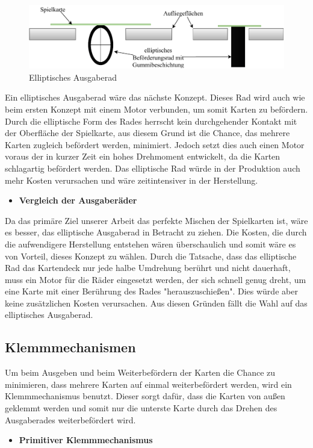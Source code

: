 \begin{figure}[H]
    \centering
    \includegraphics[scale=0.9,page=1]{fig/mech/ElliptischesAusgaberad}
    \caption{Elliptisches Ausgaberad}
\end{figure}


Ein elliptisches Ausgaberad wäre das nächste Konzept.
Dieses Rad wird auch wie beim ersten Konzept mit einem Motor verbunden, um somit Karten zu befördern.
Durch die elliptische Form des Rades herrscht kein durchgehender Kontakt mit der Oberfläche der Spielkarte, aus diesem Grund ist die Chance, das mehrere
Karten zugleich befördert werden, minimiert.
Jedoch setzt dies auch einen Motor voraus der in kurzer Zeit ein hohes Drehmoment entwickelt, da die
Karten schlagartig befördert werden.
Das elliptische Rad würde in der Produktion auch mehr Kosten verursachen und wäre zeitintensiver in der Herstellung. \\

\begin{itemize}
    \item \textbf{Vergleich der Ausgaberäder}
\end{itemize}

Da das primäre Ziel unserer Arbeit das perfekte Mischen der Spielkarten ist, wäre es besser, das elliptische Ausgaberad in Betracht zu ziehen.
Die Kosten, die durch die aufwendigere Herstellung entstehen wären überschaulich und somit wäre es von Vorteil, dieses Konzept zu wählen.
Durch die Tatsache, dass das elliptische Rad das Kartendeck nur jede halbe Umdrehung berührt und nicht dauerhaft, muss ein Motor für die Räder eingesetzt werden, der sich schnell genug dreht, um eine Karte mit einer Berührung
des Rades "herauszuschießen".
Dies würde aber keine zusätzlichen Kosten verursachen.
Aus diesen Gründen fällt die Wahl auf das elliptisches Ausgaberad. \\


\subsection{Klemmmechanismen}
Um beim Ausgeben und beim Weiterbefördern der Karten die Chance zu minimieren, dass mehrere Karten auf einmal weiterbefördert werden, wird ein
Klemmmechanismus benutzt.
Dieser sorgt dafür, dass die Karten von außen geklemmt werden und somit nur die unterste Karte durch das Drehen des
Ausgaberades weiterbefördert wird.
\newpage
\begin{itemize}
    \item \textbf{Primitiver Klemmmechanismus}
\end{itemize}

